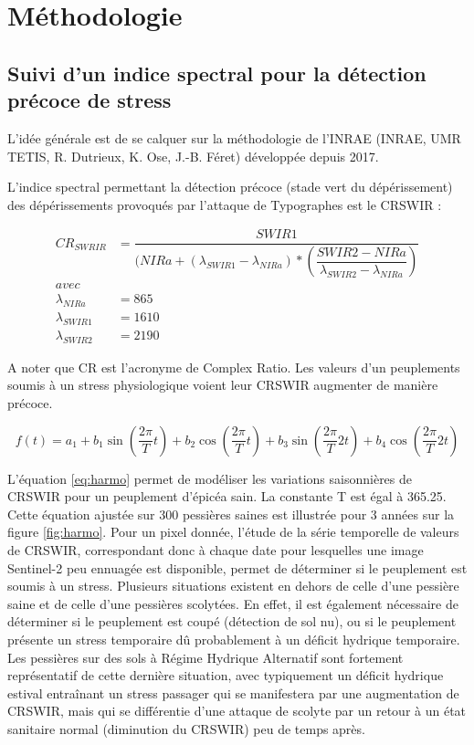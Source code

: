 \documentclass[a4paper, 12pt]{article} %
\begin{document}
\section{Méthodologie}

\subsection{Suivi d'un indice spectral pour la détection précoce de stress}


L'idée générale est de se calquer sur la méthodologie de l'INRAE (INRAE, UMR TETIS, R. Dutrieux, K. Ose, J.-B. Féret) développée depuis 2017. 

L'indice spectral permettant la détection précoce (stade vert du dépérissement) des dépérissements provoqués par l'attaque de Typographes est le CRSWIR :

\begin{align*} 
CR_{SWRIR} &= \dfrac{SWIR1}{( NIRa + (\lambda_{SWIR1}-\lambda_{NIRa})* (\dfrac{SWIR2 - NIRa}{\lambda_{SWIR2}-\lambda_{NIRa}})} \\ 
avec&\\ 
\lambda_{NIRa} &=865\\ 
\lambda_{SWIR1} &=1610\\ 
\lambda_{SWIR2} &=2190
\end{align*} 

A noter que CR est l'acronyme de Complex Ratio.
Les valeurs d'un peuplements soumis à un stress physiologique voient leur CRSWIR augmenter de manière précoce.

\begin{equation}\label{eq:harmo}
 f(t) =   a_{1} + b_{1} \sin(\dfrac{2\pi}{T}t)+ b_{2} \cos(\dfrac{2\pi}{T}t)+ b_{3} \sin(\dfrac{2\pi}{T}2t)+ b_{4} \cos(\dfrac{2\pi}{T}2t)
\end{equation} 

L'équation \ref{eq:harmo} permet de modéliser les variations saisonnières de CRSWIR pour un peuplement d'épicéa sain. La constante T est égal à 365.25. Cette équation ajustée sur 300 pessières saines est illustrée pour 3 années sur la figure \ref{fig:harmo}. Pour un pixel donnée, l'étude de la série temporelle de valeurs de CRSWIR, correspondant donc à chaque date pour lesquelles une image Sentinel-2 peu ennuagée est disponible, permet de déterminer si le peuplement est soumis à un stress. Plusieurs situations existent en dehors de celle d'une pessière saine et de celle d'une pessières scolytées. En effet, il est également nécessaire de déterminer si le peuplement est coupé (détection de sol nu), ou si le peuplement présente un stress temporaire dû probablement à un déficit hydrique temporaire. Les pessières sur des sols à Régime Hydrique Alternatif sont fortement représentatif de cette dernière situation, avec typiquement un déficit hydrique estival entraînant un stress passager qui se manifestera par une augmentation de CRSWIR, mais qui se différentie d'une attaque de scolyte par un retour à un état sanitaire normal (diminution du CRSWIR) peu de temps après.
\end{document}
